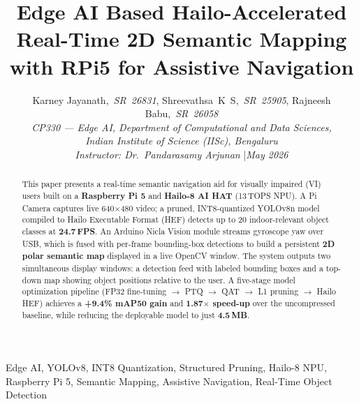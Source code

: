 \documentclass[journal, onecolumn]{IEEEtran}
\begin{document}
\title{Edge AI Based Hailo-Accelerated Real-Time 2D Semantic Mapping\\
       with RPi5 for Assistive Navigation}

\author{Karney Jayanath,~\textit{SR~26831},\quad
        Shreevathsa~K~S,~\textit{SR~25905},\quad
        Rajneesh Babu,~\textit{SR~26058}\\[2pt]
        \textit{CP330 — Edge AI, Department of Computational and Data Sciences,}\\
        \textit{Indian Institute of Science (IISc), Bengaluru}\\
        \textit{Instructor: Dr.\ Pandarasamy Arjunan} \quad|\quad \textit{May 2026}
}

\maketitle

\begin{abstract}
This paper presents a real-time semantic navigation aid for visually impaired (VI) users built on a \textbf{Raspberry Pi 5} and \textbf{Hailo-8 AI HAT} (13\,TOPS NPU). A Pi Camera captures live 640$\times$480 video; a pruned, INT8-quantized YOLOv8n model compiled to Hailo Executable Format (HEF) detects up to 20 indoor-relevant object classes at \textbf{24.7\,FPS}. An Arduino Nicla Vision module streams gyroscope yaw over USB, which is fused with per-frame bounding-box detections to build a persistent \textbf{2D polar semantic map} displayed in a live OpenCV window. The system outputs two simultaneous display windows: a detection feed with labeled bounding boxes and a top-down map showing object positions relative to the user. A five-stage model optimization pipeline (FP32 fine-tuning $\to$ PTQ $\to$ QAT $\to$ L1 pruning $\to$ Hailo HEF) achieves a \textbf{+9.4\% mAP50 gain} and \textbf{1.87$\times$ speed-up} over the uncompressed baseline, while reducing the deployable model to just \textbf{4.5\,MB}.
\end{abstract}

\begin{IEEEkeywords}
Edge AI, YOLOv8, INT8 Quantization, Structured Pruning, Hailo-8 NPU,
Raspberry Pi 5, Semantic Mapping, Assistive Navigation, Real-Time Object Detection
\end{IEEEkeywords}

\end{document}
